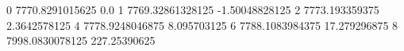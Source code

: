 0 7770.8291015625 0.0
1 7769.32861328125 -1.50048828125
2 7773.193359375 2.3642578125
4 7778.9248046875 8.095703125
6 7788.1083984375 17.279296875
8 7998.0830078125 227.25390625
